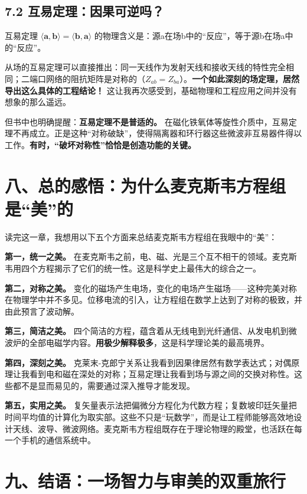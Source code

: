\documentclass[12pt,a4paper]{ctexart}
\begin{document}
\subsection*{7.2 互易定理：因果可逆吗？}

互易定理 $\langle \mathbf{a}, \mathbf{b} \rangle = \langle \mathbf{b}, \mathbf{a} \rangle$ 的物理含义是：源a在场b中的“反应”，等于源b在场a中的“反应”。

从场的互易定理可以直接推出：同一天线作为发射天线和接收天线的特性完全相同；二端口网络的阻抗矩阵是对称的（$Z_{ab} = Z_{ba}$）。\textbf{一个如此深刻的场定理，居然导出这么具体的工程结论！} 这让我再次感受到，基础物理和工程应用之间并没有想象的那么遥远。

但书中也明确提醒：\textbf{互易定理不是普适的。} 在磁化铁氧体等旋性介质中，互易定理不再成立。正是这种“对称破缺”，使得隔离器和环行器这些微波非互易器件得以工作。\textbf{有时，“破坏对称性”恰恰是创造功能的关键。}

\section*{八、总的感悟：为什么麦克斯韦方程组是“美”的}

读完这一章，我想用以下五个方面来总结麦克斯韦方程组在我眼中的“美”：

\textbf{第一，统一之美。} 在麦克斯韦之前，电、磁、光是三个互不相干的领域。麦克斯韦用四个方程揭示了它们的统一性。这是科学史上最伟大的综合之一。

\textbf{第二，对称之美。} 变化的磁场产生电场，变化的电场产生磁场——这种完美对称在物理学中并不多见。位移电流的引入，让方程组在数学上达到了对称的极致，并由此预言了波动解。

\textbf{第三，简洁之美。} 四个简洁的方程，蕴含着从无线电到光纤通信、从发电机到微波炉的全部电磁学内容。\textbf{用极少解释极多}，这是科学理论美的最高境界。

\textbf{第四，深刻之美。} 克莱末-克郎宁关系让我看到因果律居然有数学表达式；对偶原理让我看到电和磁在深处的对称；互易定理让我看到场与源之间的交换对称性。这些都不是显而易见的，需要通过深入推导才能发现。

\textbf{第五，实用之美。} 复矢量表示法把偏微分方程化为代数方程；复数坡印廷矢量把时间平均值的计算化为取实部。这些不只是“玩数学”，而是让工程师能够高效地设计天线、波导、微波网络。麦克斯韦方程组既存在于理论物理的殿堂，也活跃在每一个手机的通信系统中。

\section*{九、结语：一场智力与审美的双重旅行}
\end{document}
